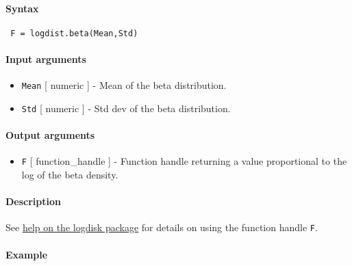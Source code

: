 


	\paragraph{Syntax}
 
 \begin{verbatim}
 F = logdist.beta(Mean,Std)
 \end{verbatim}
 
 \paragraph{Input arguments}
 
 \begin{itemize}
 \item
   \texttt{Mean} {[} numeric {]} - Mean of the beta distribution.
 \item
   \texttt{Std} {[} numeric {]} - Std dev of the beta distribution.
 \end{itemize}
 
 \paragraph{Output arguments}
 
 \begin{itemize}
 \item
   \texttt{F} {[} function\_handle {]} - Function handle returning a
   value proportional to the log of the beta density.
 \end{itemize}
 
 \paragraph{Description}
 
 See \href{logdist/Contents}{help on the logdisk package} for details on
 using the function handle \texttt{F}.
 
 \paragraph{Example}


